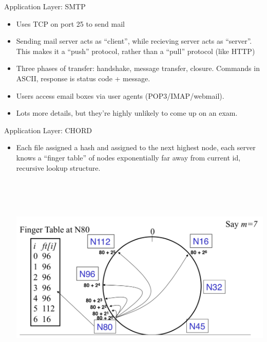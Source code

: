 \documentclass{beamer}
\begin{document}
\begin{frame}[t]{Application Layer: SMTP}
    \begin{itemize}
        \item Uses TCP on port 25 to send mail
        \item Sending mail server acts as ``client'', while recieving server acts as ``server''. This makes it a ``push'' protocol, rather than a ``pull'' protocol (like HTTP)
        \item Three phases of transfer: handshake, message transfer, closure. Commands in ASCII, response is status code + message.
        \item Users access email boxes via \alert{user agents} (POP3/IMAP/webmail).
        \item Lots more details, but they're highly unlikely to come up on an exam.
    \end{itemize}
\end{frame}

\begin{frame}[t]{Application Layer: CHORD}
    \begin{itemize}
        \item Each file assigned a hash and assigned to the next highest node, each server knows a ``finger table'' of nodes exponentially far away from current id, recursive lookup structure.
        
        \includegraphics[height=10cm]{chord.png}
    \end{itemize}
\end{frame}
\end{document}
